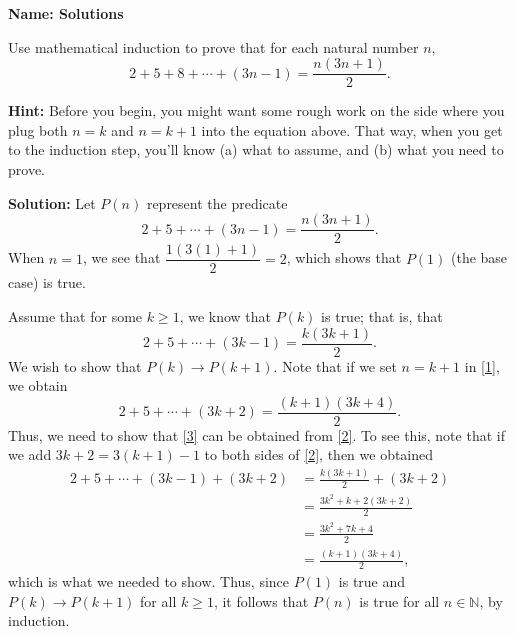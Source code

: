 \documentclass[12pt]{article}
\begin{document}
{\bf Name: Solutions}
\thispagestyle{fancy}

\bigskip


Use mathematical induction to prove that for each natural number $n$,
\[
 2+5+8+\cdots + (3n-1) = \frac{n(3n+1)}{2}.
\]

{\bf Hint:} Before you begin, you might want some rough work on the side where you plug both $n=k$ and $n=k+1$ into the equation above. That way, when you get to the induction step, you'll know (a) what to assume, and (b) what you need to prove.

\bigskip

{\bf Solution:} Let $P(n)$ represent the predicate
\begin{equation}\label{1}
 2+5+\cdots + (3n-1) = \frac{n(3n+1)}{2}.
\end{equation}
When $n=1$, we see that $\dfrac{1(3(1)+1)}{2} = 2$, which shows that $P(1)$ (the base case) is true.

Assume that for some $k\geq 1$, we know that $P(k)$ is true; that is, that
\begin{equation}\label{2}
 2+5+\cdots + (3k-1) = \frac{k(3k+1)}{2}.
\end{equation}
We wish to show that $P(k)\to P(k+1)$. Note that if we set $n=k+1$ in \eqref{1}, we obtain
\begin{equation}\label{3}
 2+5+\cdots + (3k+2) = \frac{(k+1)(3k+4)}{2}.
\end{equation}
Thus, we need to show that \eqref{3} can be obtained from \eqref{2}. To see this, note that if we add $3k+2 = 3(k+1)-1$ to both sides of \eqref{2}, then we obtained
\begin{align*}
2+5+\cdots + (3k-1) + (3k+2) &= \frac{k(3k+1)}{2}+(3k+2)\\
& = \frac{3k^2+k+2(3k+2)}{2}\\
& = \frac{3k^2+7k+4}{2}\\
& = \frac{(k+1)(3k+4)}{2},
\end{align*}
which is what we needed to show. Thus, since $P(1)$ is true and $P(k)\to P(k+1)$ for all $k\geq 1$, it follows that $P(n)$ is true for all $n\in\mathbb{N}$, by induction.
\end{document}
